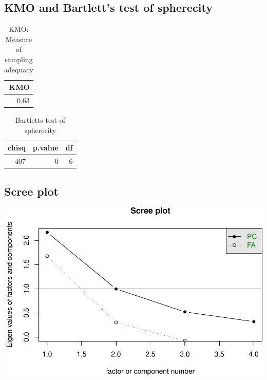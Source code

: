 \documentclass[]{article}
\begin{document}
\hypertarget{kmo-and-bartletts-test-of-spherecity-10}{%
\subsection{KMO and Bartlett's test of
spherecity}\label{kmo-and-bartletts-test-of-spherecity-10}}

\begin{table}[H]

\caption{\label{tab:unnamed-chunk-54}KMO: Measure of sampling adequacy}
\centering
\fontsize{6}{8}\selectfont
\begin{tabular}[t]{r}
\toprule
KMO\\
\midrule
0.63\\
\bottomrule
\end{tabular}
\end{table}

\begin{table}[H]

\caption{\label{tab:unnamed-chunk-54}Bartletts test of spherecity}
\centering
\fontsize{6}{8}\selectfont
\begin{tabular}[t]{rrr}
\toprule
chisq & p.value & df\\
\midrule
407 & 0 & 6\\
\bottomrule
\end{tabular}
\end{table}

\hypertarget{scree-plot-10}{%
\subsection{Scree plot}\label{scree-plot-10}}

\includegraphics{PCA_covid_files/figure-latex/unnamed-chunk-55-1.pdf}
\end{document}
